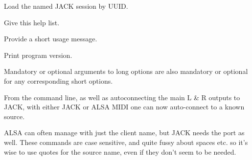       Load the named JACK session by UUID.

      Give this help list.

      Provide a short usage message.

      Print program version.

   Mandatory or optional arguments to long options are also mandatory or
   optional for any corresponding short options.

   From the command line, as well as autoconnecting the main L \& R outputs
   to JACK, with either JACK or ALSA MIDI one can now auto-connect to a
   known source.

   ALSA can often manage with just the client name, but JACK needs the port
   as well. These commands are case sensitive, and quite fussy about spaces
   etc. so it's wise to use quotes for the source name, even if they don't
   seem to be needed.

